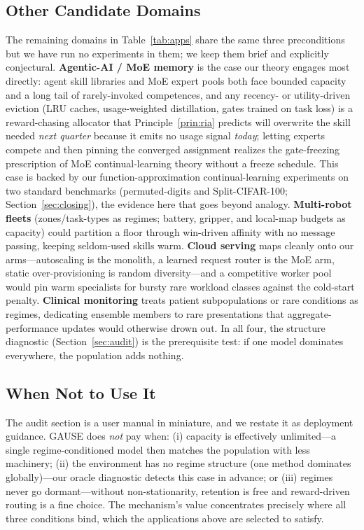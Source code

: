 \documentclass[10pt]{article}
\begin{document}
\subsection{Other Candidate Domains}

The remaining domains in Table~\ref{tab:apps} share the same three
preconditions but we have run no experiments in them; we keep them brief and
explicitly conjectural. \textbf{Agentic-AI / MoE memory} is the case our theory
engages most directly: agent skill libraries and MoE expert pools both face
bounded capacity and a long tail of rarely-invoked competences, and any
recency- or utility-driven eviction (LRU caches, usage-weighted distillation,
gates trained on task loss) is a reward-chasing allocator that
Principle~\ref{prin:ria} predicts will overwrite the skill needed \emph{next
quarter} because it emits no usage signal \emph{today}; letting experts compete
and then pinning the converged assignment realizes the gate-freezing
prescription of MoE continual-learning theory \cite{li2024moecl} without a
freeze schedule. This case is backed by our function-approximation
continual-learning experiments on two standard benchmarks (permuted-digits and
Split-CIFAR-100; Section~\ref{sec:closing}), the evidence here that goes beyond analogy. \textbf{Multi-robot fleets}
(zones/task-types as regimes; battery, gripper, and local-map budgets as
capacity) could partition a floor through win-driven affinity with no message
passing, keeping seldom-used skills warm. \textbf{Cloud serving} maps cleanly
onto our arms---autoscaling is the monolith, a learned request router is the MoE
arm, static over-provisioning is random diversity---and a competitive worker
pool would pin warm specialists for bursty rare workload classes against the
cold-start penalty. \textbf{Clinical monitoring} treats patient subpopulations
or rare conditions as regimes, dedicating ensemble members to rare presentations
that aggregate-performance updates would otherwise drown out. In all four, the
structure diagnostic (Section~\ref{sec:audit}) is the prerequisite test: if one
model dominates everywhere, the population adds nothing.

\subsection{When Not to Use It}

The audit section is a user manual in miniature, and we restate it as
deployment guidance. GAUSE does \emph{not} pay when: (i) capacity is
effectively unlimited---a single regime-conditioned model then matches the
population with less machinery; (ii) the environment has no regime structure
(one method dominates globally)---our oracle diagnostic detects this case in
advance; or (iii) regimes never go dormant---without non-stationarity,
retention is free and reward-driven routing is a fine choice. The mechanism's
value concentrates precisely where all three conditions bind, which the
applications above are selected to satisfy.
\end{document}
